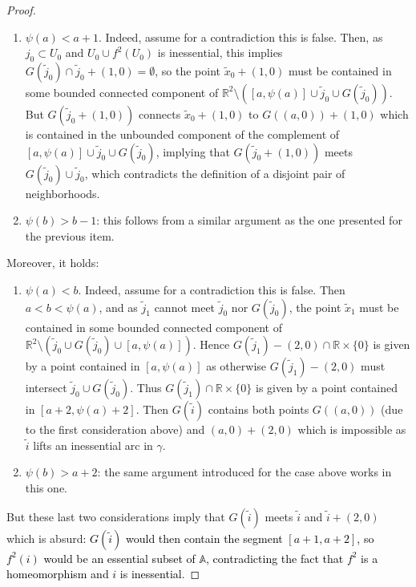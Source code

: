 \documentclass[10pt,a4paper]{amsart}
\newcommand{\A}{\mathbb{A}}
\newcommand{\R}{\mathbb{R}}
\begin{document}
\begin{proof}
\begin{enumerate}
\item $\psi(a)<a+1$. Indeed, assume for a contradiction this is false. Then, as $j_0\subset U_0$ and $U_0 \cup f^2(U_0)$ is inessential, this implies $G(\tilde{j}_0) \cap
\widetilde{j}_0+(1,0)=\emptyset$, so the point $\widetilde{x}_0+(1,0)$ must be contained in some bounded connected component of $\R^2\setminus \left([a,\psi(a)]\cup\widetilde{j}_0\cup G(\widetilde{j}_0)\right)$. But  $G(\widetilde{j}_0+(1,0))$ connects $\widetilde{x}_0+(1,0)$ to $G((a,0))+(1,0)$ which is contained in the unbounded component of the complement of
    $[a,\psi(a)]\cup\widetilde{j}_0\cup G(\widetilde{j}_0)$, implying that $G(\widetilde{j}_0+(1,0))$
    meets $G(\widetilde{j}_0)\cup\widetilde{j}_0$, which contradicts the definition of a disjoint pair of neighborhoods.

\item $\psi(b)>b-1$: this follows from a similar argument as the one presented for the previous item.
\end{enumerate}

Moreover, it holds:

\begin{enumerate}[resume]

\item $\psi(a)<b$. Indeed, assume for a contradiction this is false. Then $a<b<\psi(a)$, and as $\widetilde{j}_1$
cannot meet $\widetilde{j}_0$ nor $G(\widetilde{j}_0)$, the point $\widetilde{x}_1$ must be contained in some
bounded connected component of $\R^2\setminus \left(\widetilde{j}_0\cup G(\widetilde{j}_0)\cup [a,\psi(a)]\right)$. Hence
$G(\widetilde{j}_1)-(2,0)\cap \R\times\{0\}$ is given by a point contained in $[a,\psi(a)]$ as otherwise
$G(\widetilde{j}_1)-(2,0)$ must intersect $\widetilde{j}_0 \cup G(\widetilde{j}_0)$. Thus
$G(\widetilde{j}_1) \cap \R\times\{0\}$ is given by a point contained in $[a+2,\psi(a)+2]$. Then
$G(\widetilde{i})$ contains both points $G((a,0))$ (due to the first consideration above)
and $(a,0)+(2,0)$ which is impossible as $\widetilde{i}$ lifts an inessential arc in $\gamma$.

\item $\psi(b)>a+2$: the same argument introduced for the case above works
in this one.

\end{enumerate}

But these last two considerations imply that $G(\widetilde{i})$ meets $\widetilde{i}$ and $\widetilde{i}+(2,0)$ which is absurd\textcolor{black}{: $G(\tilde{i})$ would then contain the segment $[a+1,a+2]$, so $f^2(i)$ would be an essential subset of $\A$, contradicting the fact that $f^2$ is a homeomorphism and $i$ is inessential}.
\end{proof}
\end{document}
